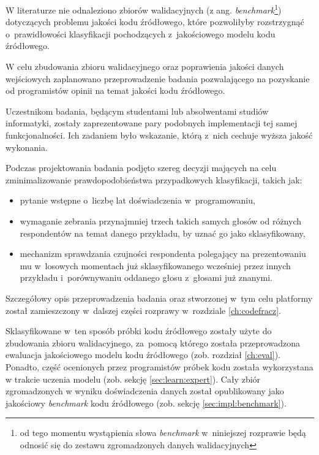 \documentclass[twoside]{praca}
\begin{document}
W literaturze nie odnaleziono zbiorów walidacyjnych (z ang. \textit{benchmark}\footnote{od tego momentu wystąpienia słowa \textit{benchmark} w~niniejszej rozprawie będą odnosić się do zestawu zgromadzonych danych walidacyjnych}) dotyczących problemu jakości kodu źródłowego, które pozwoliłyby rozstrzygnąć o~prawidłowości klasyfikacji pochodzących z~jakościowego modelu kodu źródłowego. 

W celu zbudowania zbioru walidacyjnego oraz poprawienia jakości danych wejściowych zaplanowano przeprowadzenie badania pozwalającego na pozyskanie od programistów opinii na temat jakości kodu źródłowego.

Uczestnikom badania, będącym studentami lub absolwentami studiów informatyki, zostały zaprezentowane pary podobnych implementacji tej samej funkcjonalności. Ich zadaniem było wskazanie, którą z~nich cechuje wyższa jakość wykonania. 

Podczas projektowania badania podjęto szereg decyzji mających na celu zminimalizowanie prawdopodobieństwa przypadkowych klasyfikacji, takich jak:

\begin{itemize}
    \item pytanie wstępne o~liczbę lat doświadczenia w~programowaniu,
    \item wymaganie zebrania przynajmniej trzech takich samych głosów od różnych respondentów na temat danego przykładu, by uznać go jako sklasyfikowany,
    \item mechanizm sprawdzania czujności respondenta polegający na prezentowaniu mu w~losowych momentach już sklasyfikowanego wcześniej przez innych przykładu i~porównywaniu oddanego głosu z~głosami już znanymi.
\end{itemize}

Szczegółowy opis przeprowadzenia badania oraz stworzonej w~tym celu platformy został zamieszczony w~dalszej części rozprawy w~rozdziale \ref{ch:codefracz}.

Sklasyfikowane w~ten sposób próbki kodu źródłowego zostały użyte do zbudowania zbioru walidacyjnego, za~pomocą którego została przeprowadzona ewaluacja jakościowego modelu kodu źródłowego (zob. rozdział \ref{ch:eval}). Ponadto, część ocenionych przez programistów próbek kodu została wykorzystana w trakcie uczenia modelu (zob. sekcję \ref{sec:learn:expert}). Cały zbiór zgromadzonych w wyniku doświadczenia danych został opublikowany jako jakościowy \textit{benchmark} kodu źródłowego (zob. sekcję \ref{sec:impl:benchmark}).
\end{document}
